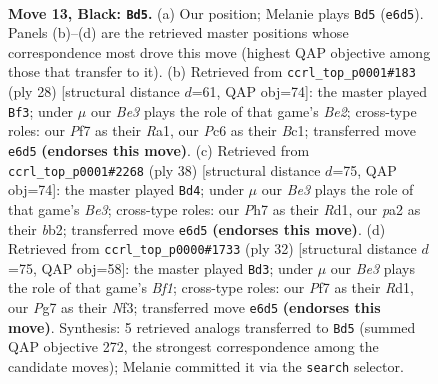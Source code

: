 \documentclass[11pt]{article}
\begin{document}
\clearpage

\begin{figure}[p]\centering
\begin{subfigure}{0.46\textwidth}\centering
\resizebox{\linewidth}{!}{%
\newchessgame
\chessboard[
  setfen={2kr2nr/ppp2ppp/2p1bq2/8/8/2P1Q3/PP3PPP/R3KB1R b KQ - 0 13},
  showmover=false,
  pgfstyle=straightmove, color=movearrow, markmove={e6-d5}
]}
\caption{}
\end{subfigure}\hfill
\begin{subfigure}{0.46\textwidth}\centering
\resizebox{\linewidth}{!}{%
\newchessgame
\chessboard[
  setfen={r1b1r1k1/5ppp/p1p5/3q4/1b6/6Q1/PP2BPPP/R1B2RK1 w - - 2 15},
  showmover=false,
  pgfstyle=straightmove, color=movearrow, markmove={e2-f3}
]}
\caption{}
\end{subfigure}
\\[4pt]
\begin{subfigure}{0.46\textwidth}\centering
\resizebox{\linewidth}{!}{%
\newchessgame
\chessboard[
  setfen={r4r1k/p1p2bpp/2p1q3/8/Q7/4B1N1/PbP2PPP/3R1RK1 w - - 2 20},
  showmover=false,
  pgfstyle=straightmove, color=movearrow, markmove={e3-d4}
]}
\caption{}
\end{subfigure}\hfill
\begin{subfigure}{0.46\textwidth}\centering
\resizebox{\linewidth}{!}{%
\newchessgame
\chessboard[
  setfen={r3k2r/2qbnpp1/p6p/1p1pP3/8/5N1P/PPPQ2P1/2KR1B1R w kq - 0 17},
  showmover=false,
  pgfstyle=straightmove, color=movearrow, markmove={f1-d3}
]}
\caption{}
\end{subfigure}
\caption{\textbf{Move 13, Black: \texttt{Bd5}.} (a) Our position; Melanie plays \texttt{Bd5} (\texttt{e6d5}). Panels (b)--(d) are the retrieved master positions whose correspondence most drove this move (highest QAP objective among those that transfer to it). (b) Retrieved from \texttt{ccrl\_top\_p0001\#183} (ply 28) [structural distance $d$=61, QAP obj=74]: the master played \texttt{Bf3}; under $\mu$ our \emph{Be3} plays the role of that game's \emph{Be2}; cross-type roles: our \emph{P}f7 as their \emph{R}a1, our \emph{P}c6 as their \emph{B}c1; transferred move \texttt{e6d5} \textbf{(endorses this move)}. (c) Retrieved from \texttt{ccrl\_top\_p0001\#2268} (ply 38) [structural distance $d$=75, QAP obj=74]: the master played \texttt{Bd4}; under $\mu$ our \emph{Be3} plays the role of that game's \emph{Be3}; cross-type roles: our \emph{P}h7 as their \emph{R}d1, our \emph{p}a2 as their \emph{b}b2; transferred move \texttt{e6d5} \textbf{(endorses this move)}. (d) Retrieved from \texttt{ccrl\_top\_p0000\#1733} (ply 32) [structural distance $d$=75, QAP obj=58]: the master played \texttt{Bd3}; under $\mu$ our \emph{Be3} plays the role of that game's \emph{Bf1}; cross-type roles: our \emph{P}f7 as their \emph{R}d1, our \emph{P}g7 as their \emph{N}f3; transferred move \texttt{e6d5} \textbf{(endorses this move)}. Synthesis: 5 retrieved analogs transferred to \texttt{Bd5} (summed QAP objective 272, the strongest correspondence among the candidate moves); Melanie committed it via the \texttt{search} selector.}
\label{fig:thought-m25}
\end{figure}
\end{document}
